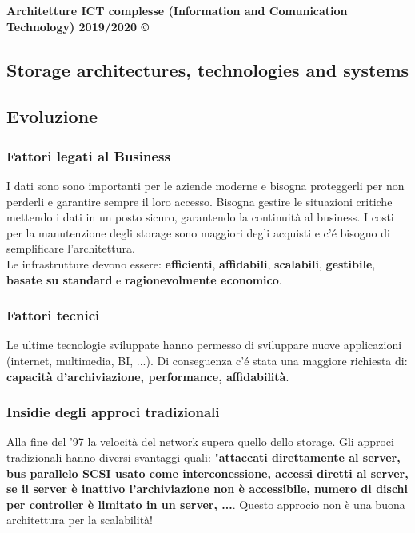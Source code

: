 \documentclass[8pt,a4paper]{extarticle}
\begin{document}
\thispagestyle{empty}
\noindent
  \textbf{Architetture ICT complesse (Information and Comunication Technology) 2019/2020 ©}
\begin{multicols*}{4} \setlength{\columnseprule}{0.4pt}
	 \section{Storage architectures, technologies and systems}
	    \subsection{Evoluzione}
	    \subsubsection{Fattori legati al Business}
		I dati sono sono importanti per le aziende moderne e bisogna proteggerli per non perderli e garantire sempre il loro accesso. Bisogna gestire le situazioni critiche mettendo i dati in un posto sicuro, garantendo la continuità al business. I costi per la manutenzione degli storage sono maggiori degli acquisti e c'é bisogno di semplificare l'architettura.
\\Le infrastrutture devono essere: \textbf{efficienti}, \textbf{affidabili}, \textbf{scalabili}, \textbf{gestibile}, \textbf{basate su standard} e \textbf{ragionevolmente economico}.
		\subsubsection{Fattori tecnici}
		Le ultime tecnologie sviluppate hanno permesso di sviluppare nuove applicazioni (internet, multimedia, BI, ...). Di conseguenza c'é stata una maggiore richiesta di: \textbf{capacità d'archiviazione, performance, affidabilità}.
		\subsubsection{Insidie degli approci tradizionali}
		Alla fine del '97 la velocità del network supera quello dello storage. Gli approci tradizionali hanno diversi svantaggi quali: "\textbf{attaccati direttamente al server, bus parallelo SCSI usato come interconessione,  accessi diretti al server, se il server è inattivo l'archiviazione non è accessibile, numero di dischi per controller è limitato in un server, ...}. Questo approcio non è una buona architettura per la scalabilità! 

\end{multicols*}
\end{document}
